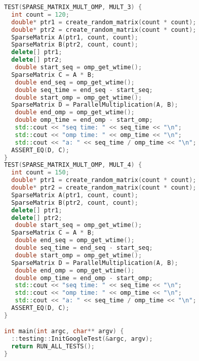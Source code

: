 \documentclass{report}
\begin{document}
\begin{lstlisting}[language=C++]
TEST(SPARSE_MATRIX_MULT_OMP, MULT_3) {
  int count = 120;
  double* ptr1 = create_random_matrix(count * count);
  double* ptr2 = create_random_matrix(count * count);
  SparseMatrix A(ptr1, count, count);
  SparseMatrix B(ptr2, count, count);
  delete[] ptr1;
  delete[] ptr2;
   double start_seq = omp_get_wtime();
  SparseMatrix C = A * B;
   double end_seq = omp_get_wtime();
   double seq_time = end_seq - start_seq;
   double start_omp = omp_get_wtime();
  SparseMatrix D = ParallelMultiplication(A, B);
   double end_omp = omp_get_wtime();
   double omp_time = end_omp - start_omp;
   std::cout << "seq time: " << seq_time << "\n";
   std::cout << "omp time: " << omp_time << "\n";
   std::cout << "a: " << seq_time / omp_time << "\n";
  ASSERT_EQ(D, C);
}
TEST(SPARSE_MATRIX_MULT_OMP, MULT_4) {
  int count = 150;
  double* ptr1 = create_random_matrix(count * count);
  double* ptr2 = create_random_matrix(count * count);
  SparseMatrix A(ptr1, count, count);
  SparseMatrix B(ptr2, count, count);
  delete[] ptr1;
  delete[] ptr2;
   double start_seq = omp_get_wtime();
  SparseMatrix C = A * B;
   double end_seq = omp_get_wtime();
   double seq_time = end_seq - start_seq;
   double start_omp = omp_get_wtime();
  SparseMatrix D = ParallelMultiplication(A, B);
   double end_omp = omp_get_wtime();
   double omp_time = end_omp - start_omp;
   std::cout << "seq time: " << seq_time << "\n";
   std::cout << "omp time: " << omp_time << "\n";
   std::cout << "a: " << seq_time / omp_time << "\n";
  ASSERT_EQ(D, C);
}

int main(int argc, char** argv) {
  ::testing::InitGoogleTest(&argc, argv);
  return RUN_ALL_TESTS();
}
\end{lstlisting}
\end{document}
